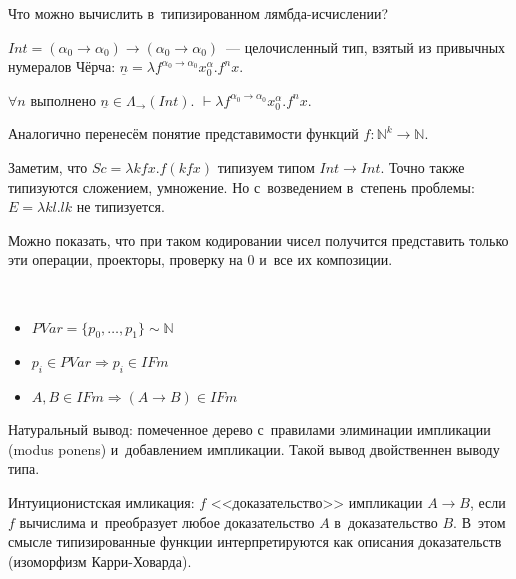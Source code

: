 \documentclass{article}
\begin{document}
Что можно вычислить в~типизированном лямбда-исчислении?

$Int = (\alpha_0 \rightarrow \alpha_0) \rightarrow (\alpha_0 \rightarrow \alpha_0)$~---
целочисленный тип, взятый из привычных нумералов Чёрча: $\underline{n} = \lambda f^{\alpha_0
\rightarrow \alpha_0} x^\alpha_0. f^n x$.

\begin{claim}
	$\forall n$ выполнено $\underline{n} \in \Lambda_\rightarrow(Int)$.
	$\vdash \lambda f^{\alpha_0 \rightarrow \alpha_0} x^\alpha_0.f^nx$.
\end{claim}

Аналогично перенесём понятие представимости функций $f: \mathbb{N}^k \rightarrow \mathbb{N}$.

Заметим, что $Sc = \lambda kfx.f(kfx)$ типизуем типом $Int \rightarrow Int$. Точно также типизуются
сложением, умножение. Но с~возведением в~степень проблемы: $E = \lambda kl.lk$ не типизуется.

Можно показать, что при таком кодировании чисел получится представить только эти операции,
проекторы, проверку на 0 и~все их композиции.

\begin{definition}~
	\begin{itemize}
		\item $PVar = \{p_0, \ldots, p_1\} \sim \mathbb{N}$
		\item $p_i \in PVar \Rightarrow p_i \in IFm$
		\item $A, B \in IFm \Rightarrow (A \rightarrow B) \in IFm$
	\end{itemize}

\end{definition}

Натуральный вывод: помеченное дерево с~правилами элиминации импликации (modus ponens) и~добавлением
импликации. Такой вывод двойственнен выводу типа.

Интуиционистская имликация: $f$ <<доказательство>> импликации $A \rightarrow B$, если $f$ вычислима
и~преобразует любое доказательство $A$ в~доказательство $B$. В~этом смысле типизированные функции
интерпретируются как описания доказательств (изоморфизм Карри-Ховарда).
\end{document}
